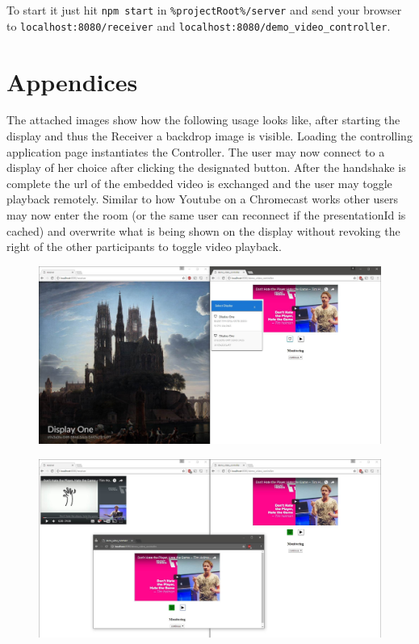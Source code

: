 \documentclass[journal]{IEEEtran}
\begin{document}
To start it just hit  {\lstinline[style=inline]$npm start$} in  {\lstinline[style=inline]$%projectRoot%/server$} and send your browser to  {\lstinline[style=inline]$localhost:8080/receiver$} and  {\lstinline[style=inline]$localhost:8080/demo_video_controller$}.

\newpage
\section{Appendices}
\label{appendices}

The attached images show how the following usage looks like, after starting the display and thus the Receiver a backdrop image is visible. Loading the controlling application page instantiates the Controller. The user may now connect to a display of her choice after clicking the designated button. After the handshake is complete the url of the embedded video is exchanged and the user may toggle playback remotely. Similar to how Youtube on a Chromecast works other users may now enter the room (or the same user can reconnect if the presentationId is cached) and overwrite what is being shown on the display without revoking the right of the other participants to toggle video playback.


\begin{figure}[!ht]
\centering\label{demo1}
\includegraphics[width=6.5in]{img/demo1.jpg}
\end{figure}

\begin{figure}[!ht]
\centering\label{demo4}
\includegraphics[width=6.5in]{img/demo4.jpg}
\end{figure}
\end{document}
